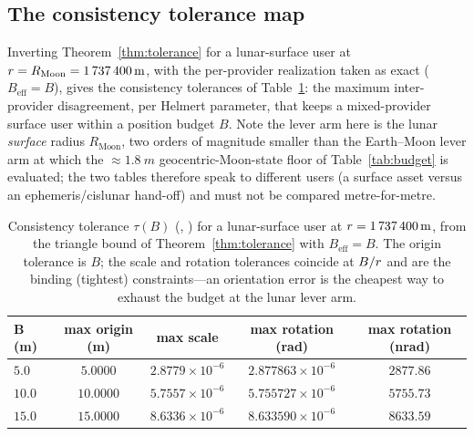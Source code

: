 \subsection{The consistency tolerance map}
\label{sec:tolmap}

Inverting Theorem~\ref{thm:tolerance} for a lunar-surface user at
$r=R_{\mathrm{Moon}}=\SI{1737400}{m}$, with the per-provider realization taken
as exact ($B_{\mathrm{eff}}=B$), gives the consistency tolerances of
Table~\ref{tab:tolerance}: the maximum inter-provider disagreement, per Helmert
parameter, that keeps a mixed-provider surface user within a position budget $B$. Note
the lever arm here is the lunar \emph{surface} radius $R_{\mathrm{Moon}}$, two orders
of magnitude smaller than the Earth--Moon lever arm at which the
$\approx\!\SI{1.8}{m}$ geocentric-Moon-state floor of Table~\ref{tab:budget} is
evaluated; the two tables therefore speak to different users (a surface asset versus an
ephemeris/cislunar hand-off) and must not be compared metre-for-metre.

\begin{table}[t]
\centering
\caption{Consistency tolerance $\tau(B)$ (\Modelled{}, \modtag{}) for a lunar-surface
user at $r=\SI{1737400}{m}$, from the triangle bound of
Theorem~\ref{thm:tolerance} with $B_{\mathrm{eff}}=B$. The origin tolerance is $B$;
the scale and rotation tolerances coincide at $B/r$ and are the binding (tightest)
constraints---an orientation error is the cheapest way to exhaust the budget at the
lunar lever arm.}
\label{tab:tolerance}
\small
\begin{tabular}{@{}lcccc@{}}
\toprule
$\bm{B}$ \textbf{(m)} & \textbf{max origin (m)} & \textbf{max scale} &
\textbf{max rotation (rad)} & \textbf{max rotation (nrad)} \\
\midrule
$5.0$  & $5.0000$  & $2.8779\times10^{-6}$ & $2.877863\times10^{-6}$ & $2877.86$ \\
$10.0$ & $10.0000$ & $5.7557\times10^{-6}$ & $5.755727\times10^{-6}$ & $5755.73$ \\
$15.0$ & $15.0000$ & $8.6336\times10^{-6}$ & $8.633590\times10^{-6}$ & $8633.59$ \\
\bottomrule
\end{tabular}
\end{table}

